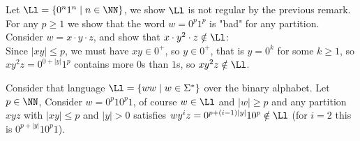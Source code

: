 \begin{example}
	  Let $\Ll = \{0^n1^n\mid n\in \NN\}$, we show $\Ll$ is not regular by the previous remark. For any $p\geq 1$ we show that the word $w = 0^p1^p$ is "bad" for any partition. Consider $w = x\cdot y\cdot z$, and show that $x\cdot y^2 \cdot z\notin\Ll$:\\
	Since $|xy|\leq p$, we must have $xy\in 0^+$, so $y\in 0^+$, that is $y = 0^k$ for some $k\geq 1$, so $xy^2z = 0^{0+|y|}1^p$ contains more $0$s than $1$s, so $xy^2z\notin \Ll$.
\end{example}
\begin{example}
	Consider that language  $\Ll = \{ww\mid w\in \Sigma^*\}$ over the binary alphabet. Let $p\in \NN$, Consider $w = 0^p10^p1$, of course $w\in \Ll$ and $|w| \geq p$ and any partition $xyz$ with $|xy|\leq p$ and $|y| > 0$ satisfies $wy^iz = 0^{p+(i-1)|y|}10^p\notin \Ll$ (for $i=2$ this is $0^{p+|y|}10^p1$).
\end{example}
